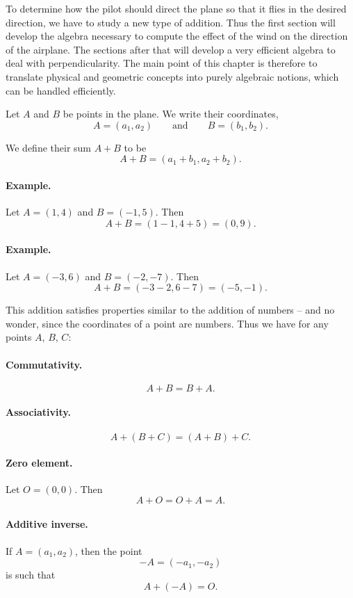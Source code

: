 \documentclass[12pt]{book} %
\begin{document}

To determine how the pilot should direct the plane so that it flies in the desired direction, we have to study a new type of addition. Thus the first section will develop the algebra necessary to compute the effect of the wind on the direction of the airplane. The sections after that will develop a very efficient algebra to deal with perpendicularity. The main point of this chapter is therefore to translate physical and geometric concepts into purely algebraic notions, which can be handled efficiently.

Let $A$ and $B$ be points in the plane. We write their coordinates,
\[
A=(a_1,a_2)
\qquad \text{and} \qquad
B=(b_1,b_2).
\]

We define their sum $A+B$ to be
\[
A+B=(a_1+b_1,a_2+b_2).
\]

\paragraph{Example.}
Let $A=(1,4)$ and $B=(-1,5)$. Then
\[
A+B=(1-1,4+5)=(0,9).
\]

\paragraph{Example.}
Let $A=(-3,6)$ and $B=(-2,-7)$. Then
\[
A+B=(-3-2,6-7)=(-5,-1).
\]

This addition satisfies properties similar to the addition of numbers -- and no wonder, since the coordinates of a point are numbers. Thus we have for any points $A$, $B$, $C$:

\paragraph{Commutativity.}
\[
A+B=B+A.
\]

\paragraph{Associativity.}
\[
A+(B+C)=(A+B)+C.
\]

\paragraph{Zero element.}
Let $O=(0,0)$. Then
\[
A+O=O+A=A.
\]

\paragraph{Additive inverse.}
If $A=(a_1,a_2)$, then the point
\[
-A=(-a_1,-a_2)
\]
is such that
\[
A+(-A)=O.
\]
\end{document}
